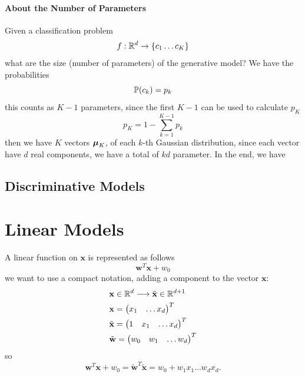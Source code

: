 \documentclass[10pt, letterpaper]{report}
\begin{document}
\subsubsection{About the Number of Parameters}
Given a classification problem$$f:{\mathbb R}^d\rightarrow\{c_1\dots c_K\}$$
what are the size (number of parameters) of the generative model? We have the probabilities$${\mathbb P}(c_k)=p_k $$ this counts as $K-1$ parameters, since the first $K-1$ can be used to calculate $p_K$\begin{equation}
	p_K=1-\sum_{k=1}^{K-1}p_k
\end{equation}
then we have $K$ vectors ${\boldsymbol{\mu}}_K$, of each $k$-th Gaussian distribution, since each vector have $d$ real components, we have a total of $kd$ parameter. In the end, we have
\section{Discriminative Models}
\chapter{Linear Models}
A linear function on $\mathbf x$ is represented as follows\begin{equation}
	\mathbf w^T\mathbf x+w_0
\end{equation}
we want to use a compact notation, adding a component to the vector $\mathbf x$:\begin{align}
	 & \mathbf x \in {\mathbb R}^d\longrightarrow \tilde{\mathbf x}\in {\mathbb R}^{d+1} \\
	 & \mathbf x=\begin{pmatrix}
		             x_1 & \dots x_d
	             \end{pmatrix}^T                                       \\
	 & \tilde{\mathbf x}=\begin{pmatrix}
		                     1 & x_1 & \dots x_d
	                     \end{pmatrix}^T                           \\
	 & \tilde{\mathbf w}=\begin{pmatrix}
		                     w_0 & w_1 & \dots w_d
	                     \end{pmatrix}^T
\end{align}
so\begin{equation}
	\mathbf w^T\mathbf x +w_0=\tilde{\mathbf w}^T\tilde{\mathbf x}=w_0+w_1x_1\dots w_dx_d.
\end{equation}

%
\cite{} %
%
%
\end{document}
